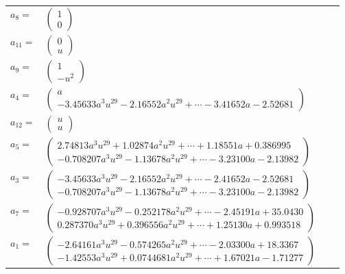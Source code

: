 \documentclass[1p]{elsarticle_modified}
\theoremstyle{definition}
\begin{document}
\begin{tabular}{m{7pt} m{180pt} m{7pt} m{180pt} }
\flushright $a_{8}=$&$\begin{pmatrix}1\\0\end{pmatrix}$ \\
\flushright $a_{11}=$&$\begin{pmatrix}0\\u\end{pmatrix}$ \\
\flushright $a_{9}=$&$\begin{pmatrix}1\\- u^2\end{pmatrix}$ \\
\flushright $a_{4}=$&$\begin{pmatrix}a\\-3.45633 a^{3} u^{29}-2.16552 a^{2} u^{29}+\cdots-3.41652 a-2.52681\end{pmatrix}$ \\
\flushright $a_{12}=$&$\begin{pmatrix}u\\u\end{pmatrix}$ \\
\flushright $a_{5}=$&$\begin{pmatrix}2.74813 a^{3} u^{29}+1.02874 a^{2} u^{29}+\cdots+1.18551 a+0.386995\\-0.708207 a^{3} u^{29}-1.13678 a^{2} u^{29}+\cdots-3.23100 a-2.13982\end{pmatrix}$ \\
\flushright $a_{3}=$&$\begin{pmatrix}-3.45633 a^{3} u^{29}-2.16552 a^{2} u^{29}+\cdots-2.41652 a-2.52681\\-0.708207 a^{3} u^{29}-1.13678 a^{2} u^{29}+\cdots-3.23100 a-2.13982\end{pmatrix}$ \\
\flushright $a_{7}=$&$\begin{pmatrix}-0.928707 a^{3} u^{29}-0.252178 a^{2} u^{29}+\cdots-2.45191 a+35.0430\\0.287370 a^{3} u^{29}+0.396556 a^{2} u^{29}+\cdots+1.25130 a+0.993518\end{pmatrix}$ \\
\flushright $a_{1}=$&$\begin{pmatrix}-2.64161 a^{3} u^{29}-0.574265 a^{2} u^{29}+\cdots-2.03300 a+18.3367\\-1.42553 a^{3} u^{29}+0.0744681 a^{2} u^{29}+\cdots+1.67021 a-1.71277\end{pmatrix}$ \\

\end{tabular}
\end{document}
